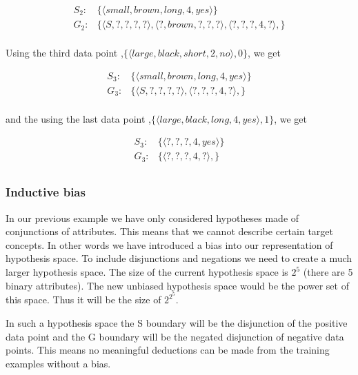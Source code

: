 \documentclass[10pt,a4paper]{article}
\begin{document}
\begin{equation}
\begin{split}
S_2: & \{ \langle small,brown,long,4,yes\rangle \} \\
G_2: & \{ \langle S,?,?,?,?\rangle, \langle?,brown,?,?,?\rangle, \langle?,?,?,4,?\rangle, \} \\
\end{split}
\end{equation}

Using the third data point ,$\{\langle large, black, short, 2, no\rangle, 0\}$, we get

\begin{equation}
\begin{split}
S_3: & \{ \langle small,brown,long,4,yes\rangle \} \\
G_3: & \{ \langle S,?,?,?,?\rangle, \langle?,?,?,4,?\rangle, \} \\
\end{split}
\end{equation}

and the using the last data point ,$\{\langle large, black, long, 4, yes\rangle, 1\}$, we get

\begin{equation}
\begin{split}
S_3: & \{ \langle ?,?,?,4,yes\rangle \} \\
G_3: & \{ \langle?,?,?,4,?\rangle, \} \\
\end{split}
\end{equation}

\citep{stan,Riedmiller}

\subsubsection{Inductive bias}

In our previous example we have only considered hypotheses made of conjunctions of attributes. This means that we cannot describe certain target concepts. In other words we have introduced a bias into our representation of hypothesis space. To include disjunctions and negations we need to create a much larger hypothesis space. The size of the current hypothesis space is $2^5$ (there are 5 binary attributes). The new unbiased hypothesis space would be the power set of this space. Thus it will be the size of $2^{2^5}$. 

In such a hypothesis space the S boundary will be the disjunction of the positive data point and the G
boundary will be the negated disjunction of negative data points. This means no meaningful deductions can be made from the training examples without a bias.
\end{document}
